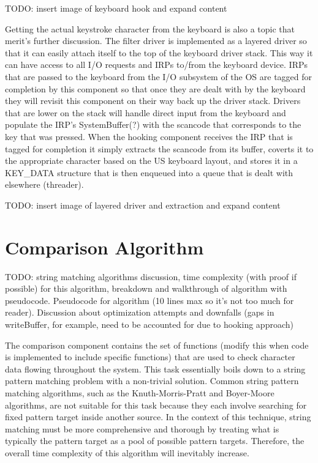 \documentclass[times, 10pt,twocolumn]{article}
\begin{document}
TODO: insert image of keyboard hook and expand content

Getting the actual keystroke character from the keyboard is also a topic that merit's further discussion. The filter driver is implemented as a layered driver so that it can easily attach itself to the top of the keyboard driver stack. This way it can have access to all I/O requests and IRPs to/from the keyboard device. IRPs that are passed to the keyboard from the I/O subsystem of the OS are tagged for completion by this component so that once they are dealt with by the keyboard they will revisit this component on their way back up the driver stack. Drivers that are lower on the stack will handle direct input from the keyboard and populate the IRP's SystemBuffer(?) with the scancode that corresponds to the key that was pressed. When the hooking component receives the IRP that is tagged for completion it simply extracts the scancode from its buffer, coverts it to the appropriate character based on the US keyboard layout, and stores it in a KEY\_DATA structure that is then enqueued into a queue that is dealt with elsewhere (threader).

TODO: insert image of layered driver and extraction and expand content


\section{Comparison Algorithm}
\label{Comparison}

TODO: string matching algorithms discussion, time complexity (with proof if possible) for this algorithm, breakdown and walkthrough of algorithm with pseudocode. Pseudocode for algorithm (10 lines max so it's not too much for reader). Discussion about optimization attempts and downfalls (gaps in writeBuffer, for example, need to be accounted for due to hooking approach)

The comparison component contains the set of functions (modify this when code is implemented to include specific functions) that are used to check character data flowing throughout the system. This task essentially boils down to a string pattern matching problem with a non-trivial solution. Common string pattern matching algorithms, such as the Knuth-Morris-Pratt and Boyer-Moore algorithms, are not suitable for this task because they each involve searching for fixed pattern target inside another source. In the context of this technique, string matching must be more comprehensive and thorough by treating what is typically the pattern target as a pool of possible pattern targets. Therefore, the overall time complexity of this algorithm will inevitably increase.
\end{document}
